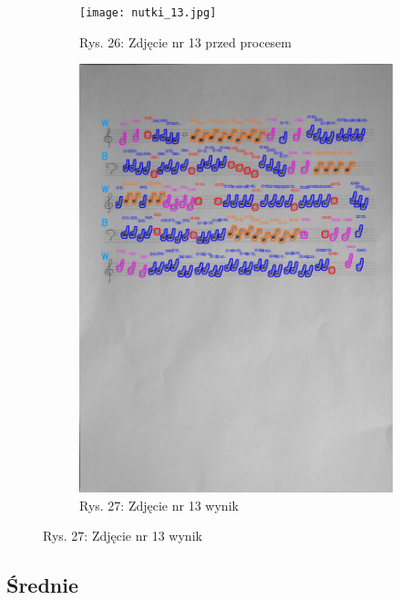 \documentclass[11pt]{article}
\begin{document}
\begin{figure}
\begin{subfigure}[b]{0.475\textwidth}
        \texttt{[image: nutki\_13.jpg]}
        \caption[]%
        {{\small Rys. 26: Zdjęcie nr 13 przed procesem}}
        \label{fig:sub3}
    \end{subfigure}
    \quad
    \begin{subfigure}[b]{0.475\textwidth}
        \centering
        \graphicspath{ {blobs/} }
        \includegraphics[width=\textwidth]{13_cnts.jpg}
        \caption[]%
        {{\small Rys. 27: Zdjęcie nr 13 wynik}}
        \label{fig:sub 4}
    \end{subfigure}
    \label{fig 2}
\end{figure}

\FloatBarrier

\subsection{Średnie}
\end{document}
